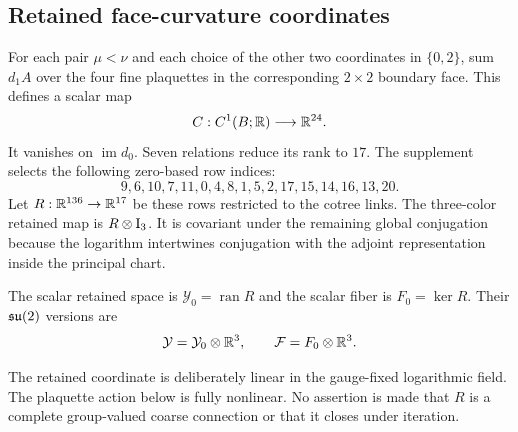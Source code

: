\subsection{Retained face-curvature coordinates}

For each pair $\mu<\nu$ and each choice of the other two coordinates in
$\{0,2\}$, sum $d_1A$ over the four fine plaquettes in the corresponding
$2\times2$ boundary face.  This defines a scalar map
\[
 C:C^1(B;\mathbb R)\longrightarrow\mathbb R^{24}.
\]
It vanishes on $\operatorname{im}d_0$.  Seven relations reduce its rank to
$17$.  The supplement selects the following zero-based row indices:
\begin{equation}\label{eq:selected-rows}
 9,6,10,7,11,0,4,8,1,5,2,17,15,14,16,13,20.
\end{equation}
Let $R:\mathbb R^{136}\to\mathbb R^{17}$ be these rows restricted to the cotree links.
The three-color retained map is $R\otimes\mathrm I_3$.  It is covariant under the
remaining global conjugation because the logarithm intertwines conjugation
with the adjoint representation inside the principal chart.

\begin{definition}\label{def:retained-fiber}
The scalar retained space is $\mathcal Y_0=\operatorname{ran}R$ and the scalar
fiber is $F_0=\ker R$.  Their $\mathfrak{su}(2)$ versions are
\[
 \mathcal Y=\mathcal Y_0\otimes\mathbb R^3,\qquad
 \mathcal F=F_0\otimes\mathbb R^3.
\]
\end{definition}

The retained coordinate is deliberately linear in the gauge-fixed logarithmic
field.  The plaquette action below is fully nonlinear.  No assertion is made
that $R$ is a complete group-valued coarse connection or that it closes under
iteration.

